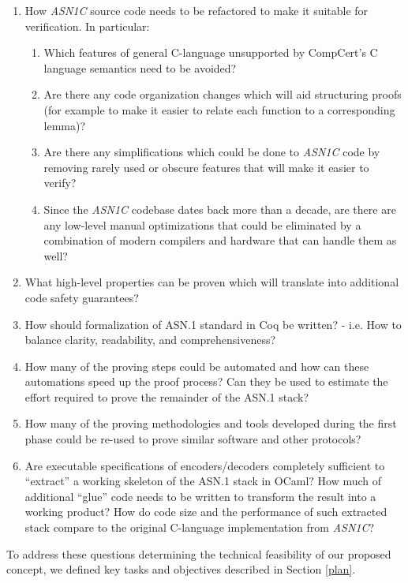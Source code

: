 \documentclass[10p,conference]{IEEEtran}
\begin{document}
\begin{enumerate}
\item How \emph{ASN1C} source code needs to be refactored to make it suitable for verification. In particular:
  \begin{enumerate}
  \item Which features of general C-language unsupported by CompCert's C language semantics need to be avoided?
  \item Are there any code organization changes which will aid structuring proofs (for example to make it easier to relate each function to a corresponding lemma)?
  \item Are there any simplifications which could be done to \emph{ASN1C} code by removing rarely used or obscure features that will make it easier to verify?
  \item Since the \emph{ASN1C} codebase dates back more than a decade, are there are any low-level manual optimizations that could be eliminated by a combination of modern compilers and hardware that can handle them as well?
  \end{enumerate}
\item What high-level properties can be proven which will translate into additional code safety guarantees?
\item How should formalization of ASN.1 standard in Coq be written? - i.e. How to balance clarity, readability, and comprehensiveness?
\item How many of the proving steps could be automated and how can these automations speed up the proof process? Can they be used to estimate the effort required to prove the remainder of the ASN.1 stack?
\item How many of the proving methodologies and tools developed during the first phase could be re-used to prove similar software and other
  protocols?
  \item Are executable specifications of encoders/decoders completely sufficient to ``extract'' a working skeleton of the ASN.1 stack in OCaml? How much of additional ``glue'' code needs to be written to transform the result into a working product? How do code size and the performance of such extracted stack compare to the original C-language implementation from \emph{ASN1C}?  
\end{enumerate}

To address these questions determining the technical feasibility of
our proposed concept, we defined key tasks and objectives described in Section \ref{plan}.
 
\end{document}
